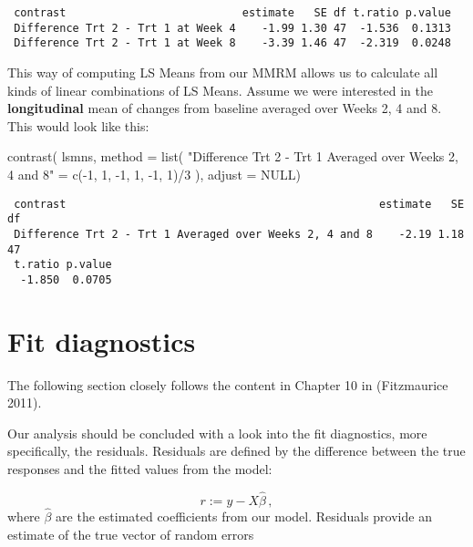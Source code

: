 \documentclass[
  letterpaper,
  DIV=11,
  numbers=noendperiod]{scrreprt}
\newenvironment{Shaded}{\begin{snugshade}}{\end{snugshade}}
\newcommand{\AttributeTok}[1]{\textcolor[rgb]{0.40,0.45,0.13}{#1}}
\newcommand{\ConstantTok}[1]{\textcolor[rgb]{0.56,0.35,0.01}{#1}}
\newcommand{\DecValTok}[1]{\textcolor[rgb]{0.68,0.00,0.00}{#1}}
\newcommand{\FunctionTok}[1]{\textcolor[rgb]{0.28,0.35,0.67}{#1}}
\newcommand{\NormalTok}[1]{\textcolor[rgb]{0.00,0.23,0.31}{#1}}
\newcommand{\OtherTok}[1]{\textcolor[rgb]{0.00,0.23,0.31}{#1}}
\newcommand{\SpecialCharTok}[1]{\textcolor[rgb]{0.37,0.37,0.37}{#1}}
\newcommand{\StringTok}[1]{\textcolor[rgb]{0.13,0.47,0.30}{#1}}
\begin{document}
\begin{verbatim}
 contrast                           estimate   SE df t.ratio p.value
 Difference Trt 2 - Trt 1 at Week 4    -1.99 1.30 47  -1.536  0.1313
 Difference Trt 2 - Trt 1 at Week 8    -3.39 1.46 47  -2.319  0.0248
\end{verbatim}

This way of computing LS Means from our MMRM allows us to calculate all
kinds of linear combinations of LS Means. Assume we were interested in
the \textbf{longitudinal} mean of changes from baseline averaged over
Weeks 2, 4 and 8. This would look like this:

\begin{Shaded}
\begin{Highlighting}[]
\FunctionTok{contrast}\NormalTok{(}
\NormalTok{  lsmns, }
  \AttributeTok{method =} \FunctionTok{list}\NormalTok{(}
    \StringTok{"Difference Trt 2 {-} Trt 1 Averaged over Weeks 2, 4 and 8"} \OtherTok{=} \FunctionTok{c}\NormalTok{(}\SpecialCharTok{{-}}\DecValTok{1}\NormalTok{, }\DecValTok{1}\NormalTok{, }\SpecialCharTok{{-}}\DecValTok{1}\NormalTok{, }\DecValTok{1}\NormalTok{, }\SpecialCharTok{{-}}\DecValTok{1}\NormalTok{, }\DecValTok{1}\NormalTok{)}\SpecialCharTok{/}\DecValTok{3}
\NormalTok{  ), }
  \AttributeTok{adjust =} \ConstantTok{NULL}\NormalTok{)}
\end{Highlighting}
\end{Shaded}

\begin{verbatim}
 contrast                                                estimate   SE df
 Difference Trt 2 - Trt 1 Averaged over Weeks 2, 4 and 8    -2.19 1.18 47
 t.ratio p.value
  -1.850  0.0705
\end{verbatim}

\hypertarget{fit-diagnostics}{%
\section{Fit diagnostics}\label{fit-diagnostics}}

The following section closely follows the content in Chapter 10 in
(Fitzmaurice 2011).

Our analysis should be concluded with a look into the fit diagnostics,
more specifically, the residuals. Residuals are defined by the
difference between the true responses and the fitted values from the
model:

\[
r := y - X\hat\beta\,,
\] where \(\hat\beta\) are the estimated coefficients from our model.
Residuals provide an estimate of the true vector of random errors
\end{document}
